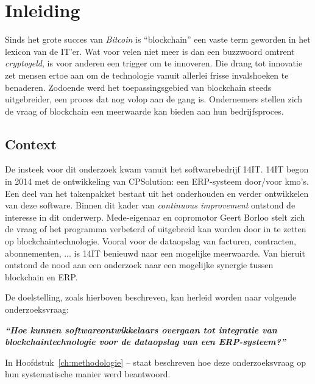 
\chapter{Inleiding}
\label{ch:inleiding}

Sinds het grote succes van \textit{Bitcoin} is ``blockchain'' een vaste term geworden in het lexicon van de IT'er. Wat voor velen niet meer is dan een buzzwoord omtrent \textit{cryptogeld}, is voor anderen een trigger om te innoveren.
Die drang tot innovatie zet mensen ertoe aan om de technologie vanuit allerlei frisse invalshoeken te benaderen. Zodoende werd het toepassingsgebied van blockchain steeds uitgebreider, een proces dat nog volop aan de gang is. Ondernemers stellen zich de vraag of blockchain een meerwaarde kan bieden aan hun bedrijfsproces.

\section{Context}
\label{sec:context}

De insteek voor dit onderzoek kwam vanuit het softwarebedrijf 14IT. 14IT begon in 2014 met de ontwikkeling van CPSolution: een ERP-systeem door/voor kmo's. Een deel van het takenpakket bestaat uit het onderhouden en verder ontwikkelen van deze software. Binnen dit kader van \textit{continuous improvement} ontstond de interesse in dit onderwerp. Mede-eigenaar en copromotor Geert Borloo stelt zich de vraag of het programma verbeterd of uitgebreid kan worden door in te zetten op blockchaintechnologie. Vooral voor de dataopslag van facturen, contracten, abonnementen, ...  is 14IT benieuwd naar een mogelijke meerwaarde. Van hieruit ontstond de nood aan een onderzoek naar een mogelijke synergie tussen blockchain en ERP. 

\pagebreak

De doelstelling, zoals hierboven beschreven, kan herleid worden naar volgende onderzoeksvraag:

\begin{center}
	\textit{\textbf{``Hoe kunnen softwareontwikkelaars overgaan tot integratie van blockchaintechnologie voor de dataopslag van een ERP-systeem?''}}
\end{center}

In Hoofdstuk~\ref{ch:methodologie} --  staat beschreven hoe deze onderzoeksvraag op hun systematische manier werd beantwoord.



